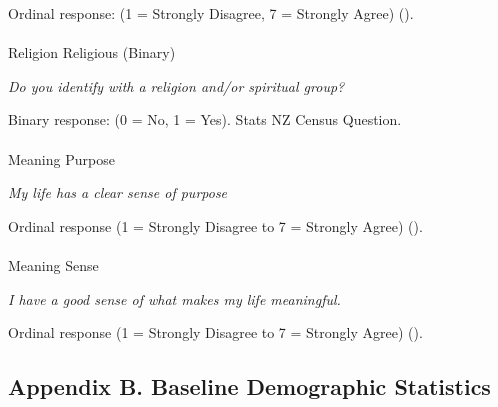 \documentclass[
  single column]{article}
\makeatletter
\let\oldparagraph\paragraph
\renewcommand{\paragraph}{
    \@ifstar
      \xxxParagraphStar
      \xxxParagraphNoStar
  }
\newcommand{\xxxParagraphStar}[1]{\oldparagraph*{#1}\mbox{}}
\newcommand{\xxxParagraphNoStar}[1]{\oldparagraph{#1}\mbox{}}
\makeatother
\begin{document}
Ordinal response: (1 = Strongly Disagree, 7 = Strongly Agree)
().

\paragraph{Religion Religious (Binary)}\label{religion-religious-binary}

\emph{Do you identify with a religion and/or spiritual group?}

Binary response: (0 = No, 1 = Yes). Stats NZ Census Question.

\paragraph{Meaning Purpose}\label{meaning-purpose-3}

\emph{My life has a clear sense of purpose}

Ordinal response (1 = Strongly Disagree to 7 = Strongly Agree)
().

\paragraph{Meaning Sense}\label{meaning-sense-3}

\emph{I have a good sense of what makes my life meaningful.}

Ordinal response (1 = Strongly Disagree to 7 = Strongly Agree)
().

\newpage{}

\subsection{Appendix B. Baseline Demographic
Statistics}\label{appendix-demographics}
\end{document}
